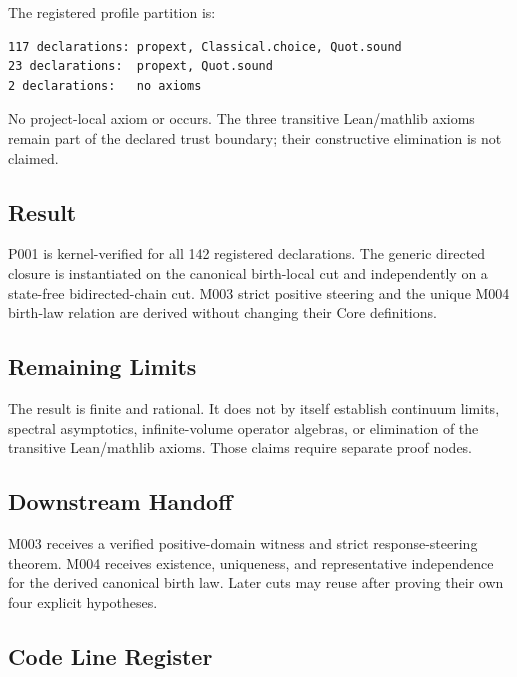 The registered profile partition is:

\begin{verbatim}
117 declarations: propext, Classical.choice, Quot.sound
23 declarations:  propext, Quot.sound
2 declarations:   no axioms
\end{verbatim}

No project-local axiom or \texttt{\protect{}} occurs. The three transitive
Lean/mathlib axioms remain part of the declared trust boundary; their
constructive elimination is not claimed.

\subsection{Result}\label{result-24}

P001 is kernel-verified for all 142 registered declarations. The generic
directed closure is instantiated on the canonical birth-local cut and
independently on a state-free bidirected-chain cut. M003 strict positive
steering and the unique M004 birth-law relation are derived without
changing their Core definitions.

\subsection{Remaining Limits}\label{remaining-limits-9}

The result is finite and rational. It does not by itself establish
continuum limits, spectral asymptotics, infinite-volume operator
algebras, or elimination of the transitive Lean/mathlib axioms. Those
claims require separate proof nodes.

\subsection{Downstream Handoff}\label{downstream-handoff-24}

M003 receives a verified positive-domain witness and strict
response-steering theorem. M004 receives existence, uniqueness, and
representative independence for the derived canonical birth law. Later
cuts may reuse \texttt{\protect{}} after proving their own
four explicit hypotheses.

\subsection{Code Line Register}\label{code-line-register-9}

